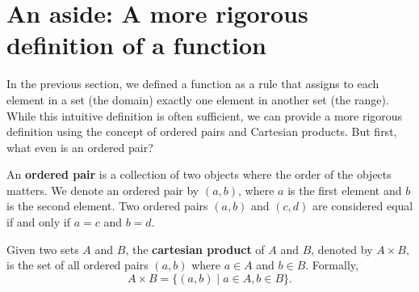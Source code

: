 \section{An aside: A more rigorous definition of a function}


In the previous section, we defined a function as a rule that assigns to each element in a set (the domain) exactly one element in another set (the range). While this intuitive definition is often sufficient, we can provide a more rigorous definition using the concept of ordered pairs and Cartesian products. But first, what even is an ordered pair?
\begin{definition}
    An \textbf{ordered pair} is a collection of two objects where the order of the objects matters. We denote an ordered pair by \((a,b)\), where \(a\) is the first element and \(b\) is the second element. Two ordered pairs \((a,b)\) and \((c,d)\) are considered equal if and only if \(a=c\) and \(b=d\).
\end{definition}
\begin{definition}
    Given two sets \(A\) and \(B\), the \textbf{cartesian product} of \(A\) and \(B\), denoted by \(A \times B\), is the set of all ordered pairs \((a,b)\) where \(a \in A\) and \(b \in B\). Formally,
\begin{equation}
        A \times B = \{(a,b) \mid a \in A, b \in B\}.
\end{equation}
\end{definition}

